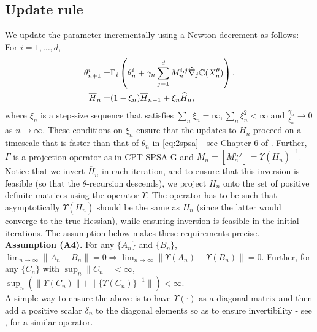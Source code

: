 \subsection{Update rule}
We update the parameter incrementally using a Newton decrement as follows: For $i=1,\ldots,d$,
\begin{align}
\label{eq:2spsa}
\theta^{i}_{n+1} =& \Gamma_{i}\left(\theta^{i}_n + \gamma_n \sum_{j=1}^{d} M_n^{i,j} \widehat \nabla_{j} \mathbb{C}(X^\theta_n)\right), \\
\overline H_n = & (1-\xi_n) \overline H_{n-1} + \xi_n \widehat H_n,\label{eq:2spsa-H}
\end{align}
where $\xi_n$ is a step-size sequence that satisfies 
$\sum_{n} \xi_n = \infty, \sum_n \xi_n^2 < \infty$ and $\frac{\gamma_n}{\xi_n}\rightarrow 0$ as $n\rightarrow \infty$. These conditions on $\xi_n$ ensure that the updates to $\overline H_n$ proceed on a timescale that is faster than that of $\theta_n$ in \eqref{eq:2spsa} - see Chapter 6 of \cite{borkar2008stochastic}.
Further, $\Gamma$ is a projection operator as in CPT-SPSA-G and  $M_n = [M_n^{i,j}] = \Upsilon(\overline H_n)^{-1}$.
Notice that we invert $\overline H_n$ in each iteration, and to ensure that this inversion is feasible (so that the $\theta$-recursion descends), we project $\overline H_n$ onto the set of positive definite matrices using the operator $\Upsilon$. The operator has to be such that asymptotically $\Upsilon(\overline H_n)$ should be the same as $\overline H_n$ (since the latter would converge to the true Hessian), while ensuring inversion is feasible in the initial iterations.  The assumption below makes these requirements precise.\\[1ex]
\textbf{Assumption (A4).}  For any $\{A_n\}$ and $\{B_n\}$,
${\displaystyle \lim_{n\rightarrow \infty} \left\| A_n-B_n \right\|}= 0 \Rightarrow {\displaystyle \lim_{n\rightarrow \infty} \parallel \Upsilon(A_n)- \Upsilon(B_n) \parallel}= 0$. Further, for any $\{C_n\}$  with
${\displaystyle \sup_n \parallel C_n\parallel}<\infty$,
${\displaystyle \sup_n \left(\parallel \Upsilon(C_n)\parallel + \parallel \{\Upsilon(C_n)\}^{-1} \parallel\right) < \infty}$.
\\[0.5ex]
A simple way to ensure the above is to have $\Upsilon(\cdot)$ as a diagonal matrix and then add a positive scalar $\delta_n$ to the diagonal elements so as to ensure invertibility  - see \cite{gill1981practical}, \cite{spall2000adaptive} for a similar operator.

